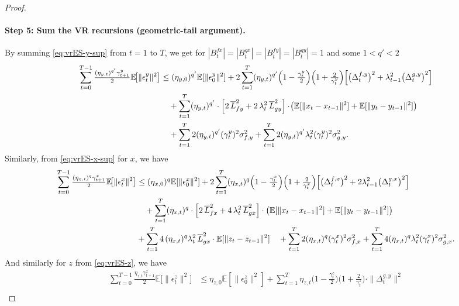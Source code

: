 \documentclass{uai2026} %
\newcommand{\EE}{\mathbb{E}}
\begin{document}
\begin{proof}
\paragraph{Step 5: Sum the VR recursions (geometric-tail argument).}
By summing \eqref{eq:vrES-y-sup} from $t=1$ to $T$, we get for $|B_{t}^{fx}|=|B_{t}^{gx}|=|B_{t}^{fy}|=|B_{t}^{gy}|=1$ and some $1<q'<2$
\begin{align}
    \sum_{t=0}^{T-1}\tfrac{(\eta_{y,t})^{q'}\gamma_{t+1}^y}{2}\EE\!\big[\|\epsilon_t^y\|^2\big]
&\le (\eta_{y,0})^{q'}\mathbb{E}[\|\epsilon_{0}^y\|^2]
+ 2\sum_{t=1}^{T}(\eta_{y,t})^{q'}\Big(1-\tfrac{\gamma_t^y}{2}\Big)\Big(1+\tfrac{2}{\gamma_t^y}\Big)\!\left[
\big(\Delta_t^{f,y}\big)^2+\lambda_{t-1}^2\big(\Delta_t^{g,y}\big)^2\right]\notag\\
&\quad + \sum_{t=1}^{T}(\eta_{y,t})^{q'}\cdot\left[2\,\overline L_{fy}^2+ 2\,\lambda_t^2\,\overline L_{gy}^2\right]\cdot\!\left(\mathbb{E}[\|x_t-x_{t-1}\|^2]+\mathbb{E}[\|y_t-y_{t-1}\|^2]\right)\notag\\
&\quad + \sum_{t=1}^{T}2(\eta_{y,t})^{q'}(\gamma_t^y)^2\sigma_{f,y}^2
+ \sum_{t=1}^{T}2(\eta_{y,t})^{q'}\lambda_t^2(\gamma_t^y)^2\sigma_{g,y}^2.\label{eq_0094}
\end{align}
Similarly, from \eqref{eq:vrES-x-sup} for $x$, we have
\begin{align}
    \sum_{t=0}^{T-1}\tfrac{(\eta_{x,t})^{q}\gamma_{t+1}^x}{2}\EE\!\big[\|\epsilon_t^x\|^2\big]
&\le (\eta_{x,0})^{q}\mathbb{E}[\|\epsilon_{0}^{x}\|^{2}]
+ 2\sum_{t=1}^{T}(\eta_{x,t})^{q}\Big(1-\tfrac{\gamma_t^x}{2}\Big)\Big(1+\tfrac{2}{\gamma_t^x}\Big)\!\left[
\big(\Delta_t^{f,x}\big)^2+2\lambda_{t-1}^2\big(\Delta_t^{g,x}\big)^2\right]\notag\\
&\quad + \sum_{t=1}^{T}(\eta_{x,t})^{q}\cdot\left[2\,\overline L_{fx}^2+4\,\lambda_t^2\,\overline L_{gx}^2\right]\cdot\left(\mathbb{E}[\|x_t-x_{t-1}\|^2]+\mathbb{E}[\|y_t-y_{t-1}\|^2]\right)\notag\\
&+ \sum_{t=1}^{T}4\,(\eta_{x,t})^{q}\lambda_t^2\,\overline L_{gx}^2\cdot\mathbb{E}[\|z_t-z_{t-1}\|^2]\quad + \sum_{t=1}^{T}2(\eta_{x,t})^{q}(\gamma_t^x)^2\sigma_{f,x}^2
+\sum_{t=1}^{T}4(\eta_{x,t})^{q}\lambda_t^2(\gamma_t^x)^2\sigma_{g,x}^2.\label{eq_0095}
\end{align}
And similarly for $z$ from \eqref{eq:vrES-z}, we have
\begin{align}
    \sum_{t=0}^{T-1}\frac{\eta_{z,t}\gamma_{t+1}^{z}}{2}\EE\!\big[\|\epsilon_t^z\|^2\big]
&\le \eta_{z,0}\mathbb{E}[\|\epsilon_{0}^z\|^2]
+ \sum_{t=1}^{T}\eta_{z,t}\Big(1-\tfrac{\gamma_t^z}{2}\Big)\Big(1+\tfrac{2}{\gamma_t^z}\Big)\cdot\|\Delta_{t}^{g,y}\|^{2}\nonumber\\

\end{align}
\end{proof}
\end{document}
